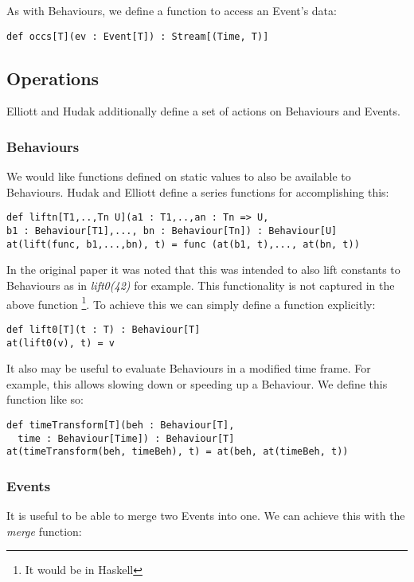         As with Behaviours, we define a function to access an Event's data:
        
\begin{verbatim}
def occs[T](ev : Event[T]) : Stream[(Time, T)]
\end{verbatim}
       
    \subsection{Operations}
      Elliott and Hudak additionally define a set of actions on Behaviours and Events.
      
      \subsubsection{Behaviours}
        We would like functions defined on static values to also be available to Behaviours. Hudak
        and Elliott define a series functions for accomplishing this:
        
\begin{verbatim}
def liftn[T1,..,Tn U](a1 : T1,..,an : Tn => U, 
b1 : Behaviour[T1],..., bn : Behaviour[Tn]) : Behaviour[U]
at(lift(func, b1,...,bn), t) = func (at(b1, t),..., at(bn, t))
\end{verbatim}

      In the original paper it was noted that this was intended to also lift constants to Behaviours
      as in \emph{lift0(42)} for example. This functionality is not captured in the above function \footnote{It would
      be in Haskell}. To achieve this we can simply define a function explicitly:

\begin{verbatim}
def lift0[T](t : T) : Behaviour[T]
at(lift0(v), t) = v
\end{verbatim}
        
       It also may be useful to evaluate Behaviours in a modified time frame. For example, this allows
       slowing down or speeding up a Behaviour. We define this function like so:

\begin{verbatim}
def timeTransform[T](beh : Behaviour[T], 
  time : Behaviour[Time]) : Behaviour[T]
at(timeTransform(beh, timeBeh), t) = at(beh, at(timeBeh, t))
\end{verbatim}
        
      \subsubsection{Events}
        It is useful to be able to merge two Events into one. We can achieve this with the \emph{merge} function:

